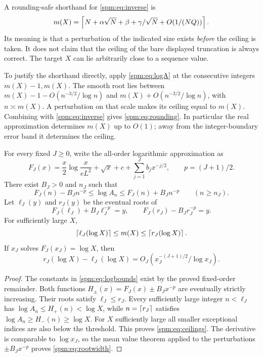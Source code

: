A rounding-safe shorthand for \eqref{spm:eq:inverse} is
\begin{equation}\label{spm:eq:rounding}
 m(X)=\left\lceil N+\alpha\sqrt N+\beta+\gamma/\sqrt N
                    +O(1/(NQ))\right\rceil.
\end{equation}
Its meaning is that a perturbation of the indicated size exists \emph{before} the ceiling is taken. It does not claim that the ceiling of the bare displayed truncation is always correct. The target $X$ can lie arbitrarily close to a sequence value.

To justify the shorthand directly, apply \eqref{spm:eq:logA} at the consecutive integers $m(X)-1,m(X)$. The smooth root lies between
$m(X)-1-O(n^{-3/2}/\log n)$ and $m(X)+O(n^{-3/2}/\log n)$, with $n\asymp m(X)$. A perturbation on that scale makes its ceiling equal to $m(X)$. Combining with \eqref{spm:eq:inverse} gives \eqref{spm:eq:rounding}. In particular the real approximation determines $m(X)$ up to $O(1)$; away from the integer-boundary error band it determines the ceiling.

\begin{theorem}\label{spm:thm:ceilings}
For every fixed $J\geq0$, write the all-order logarithmic approximation as
\[
 F_J(x)=\frac x2\log\frac{x}{eL^2}+\sqrt x+c
                 +\sum_{j=1}^J b_jx^{-j/2},\qquad p=(J+1)/2.
\]
There exist $B_J>0$ and $n_J$ such that
\begin{equation}\label{spm:eq:logbounds}
 F_J(n)-B_Jn^{-p}\leq\log A_n\leq F_J(n)+B_Jn^{-p}
 \qquad(n\geq n_J).
\end{equation}
Let $\ell_J(y)$ and $r_J(y)$ be the eventual roots of
\begin{equation}\label{spm:eq:bracketroots}
 F_J(\ell_J)+B_J\ell_J^{-p}=y,\qquad
 F_J(r_J)-B_Jr_J^{-p}=y.
\end{equation}
For sufficiently large $X$,
\begin{equation}\label{spm:eq:ceilings}
 \left\lceil \ell_J(\log X)\right\rceil\leq m(X)\leq\left\lceil r_J(\log X)\right\rceil.
\end{equation}
If $x_J$ solves $F_J(x_J)=\log X$, then
\begin{equation}\label{spm:eq:rootwidth}
 r_J(\log X)-\ell_J(\log X)
 =O_J\left(x_J^{-(J+1)/2}/\log x_J\right).
\end{equation}
\end{theorem}
\begin{proof}
The constants in \eqref{spm:eq:logbounds} exist by the proved fixed-order remainder. Both functions $H_\pm(x)=F_J(x)\pm B_Jx^{-p}$ are eventually strictly increasing. Their roots satisfy $\ell_J\leq r_J$. Every sufficiently large integer $n<\ell_J$ has
$\log A_n\leq H_+(n)<\log X$, while $n=\left\lceil r_J\right\rceil$ satisfies
$\log A_n\geq H_-(n)\geq\log X$. For $X$ sufficiently large all smaller exceptional indices are also below the threshold. This proves \eqref{spm:eq:ceilings}. The derivative is comparable to $\log x_J$, so the mean value theorem applied to the perturbations $\pm B_Jx^{-p}$ proves \eqref{spm:eq:rootwidth}.
\end{proof}

